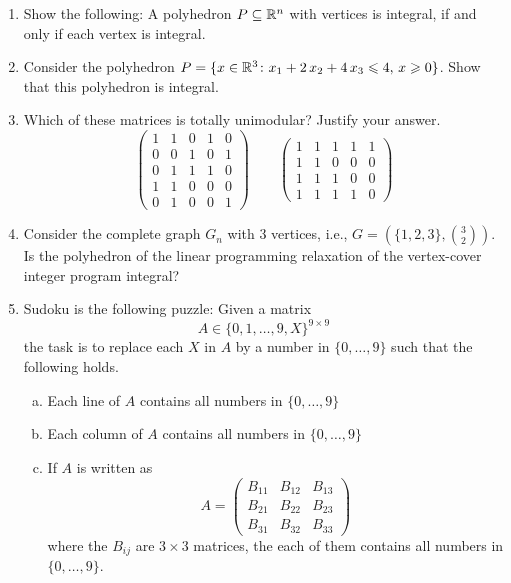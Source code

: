 \begin{enumerate}
\item Show the following: A polyhedron $P \subseteq\mathbb{R}^n$ with vertices is
  integral, if and only if each vertex is integral. \label{i:item:3}
\item Consider the polyhedron $P = \{ x \in \mathbb{R}^3 \colon x_1 + 2\,x_2 + 4\,
  x_3 \leqslant 4, \, x\geqslant0\}$. Show that this polyhedron is
  integral. \label{i:item:2}
\item Which of these matrices is totally unimodular? Justify your
  answer. \label{i:item:4}
  \begin{displaymath}
    \begin{pmatrix}
      1 & 1  & 0 &  1 & 0 \\
      0 & 0 &  1 &  0 &  1 \\
      0 & 1 &  1 &  1 & 0 \\
      1 & 1 &  0 &  0 & 0 \\
      0 & 1 &  0 &  0 & 1
    \end{pmatrix}
    \quad \quad 
    \begin{pmatrix}
      1&  1& 1& 1& 1 \\
      1& 1& 0& 0& 0\\
      1& 1& 1& 0& 0\\
      1&  1& 1& 1& 0
    \end{pmatrix}
  \end{displaymath}
\item Consider the complete graph $G_n$ with $3$ vertices, i.e., $G =
  (\{1,2,3\}, \binom{3}{2} )$. Is the polyhedron of the linear
  programming relaxation of the vertex-cover integer program integral?
  \label{i:item:5}


\item \label{e:sudoku} Sudoku is the following puzzle: Given a matrix
  \begin{displaymath}
    A ∈ \{0,1,\dots,9,X\}^{9 ×9} 
  \end{displaymath}
  the task is to replace each $X$ in $A$ by a number in $\{0,\dots,9\}$ such that the following holds.
  \begin{enumerate}[a)] 
  \item Each line of $A$ contains all numbers in  $\{0,\dots,9\}$
  \item Each column of $A$ contains all numbers in  $\{0,\dots,9\}$
  \item If $A$ is written as
    \begin{displaymath}
      A =
      \begin{pmatrix}
        B_{11} & B_{12} & B_{13} \\
        B_{21} & B_{22} & B_{23} \\
        B_{31} & B_{32} & B_{33} 
      \end{pmatrix}
    \end{displaymath}
    where the $B_{ij}$ are $3 ×3$ matrices, the each of them contains all numbers in  $\{0,\dots,9\}$.


\end{enumerate}
\end{enumerate}
